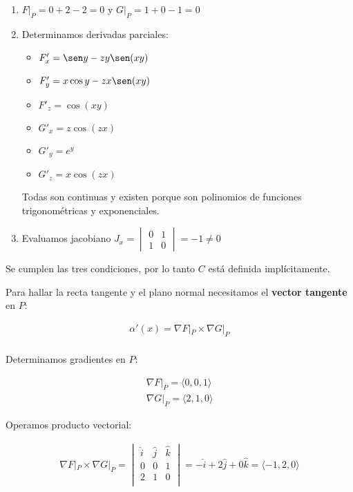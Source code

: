 \begin{enumerate}
    \item \(F|_P = 0 + 2 - 2 = \boxed{0}\) y \(G|_P = 1 + 0 - 1 = \boxed{0}\)
    \item Determinamos derivadas parciales:
          \begin{itemize}
              \item[] \(F'_x = \sen y - zy\sen(xy)\)
              \item[] \(F'_y = x\cos y - zx\sen(xy)\)
              \item[] \(F'_z = \cos(xy)\)
              \item[] \(G'_x = z\cos(zx)\)
              \item[] \(G'_y = e^{y}\)
              \item[] \(G'_z = x\cos(zx)\)
          \end{itemize}
          Todas son continuas y existen porque son polinomios de
          funciones trigonométricas y exponenciales.
    \item Evaluamos jacobiano
          \(J_x = \begin{vmatrix}
              0 & 1 \\
              1 & 0
          \end{vmatrix} = \boxed{-1 \neq 0}\)
\end{enumerate}

Se cumplen las tres condiciones,
por lo tanto \(C\) está definida implícitamente.

Para hallar la recta tangente y el plano normal necesitamos 
el \textbf{vector tangente} en \(P\):

\begin{align*}
    \alpha'(x) = \nabla F|_P \times \nabla G|_P \\
\end{align*}

Determinamos gradientes en \(P\):

\begin{align*}
    \nabla F|_P = \langle 0, 0, 1 \rangle \\
    \nabla G|_P = \langle 2, 1, 0 \rangle
\end{align*}

Operamos producto vectorial:

\begin{align*}
    \nabla F|_P \times \nabla G|_P =
    \begin{vmatrix}
        \hat{i} & \hat{j} & \hat{k} \\
        0       & 0       & 1       \\
        2       & 1       & 0       \\
    \end{vmatrix} =
    -\hat{i} + 2\hat{j} + 0\hat{k} = \boxed{\langle -1, 2, 0 \rangle}
\end{align*}


